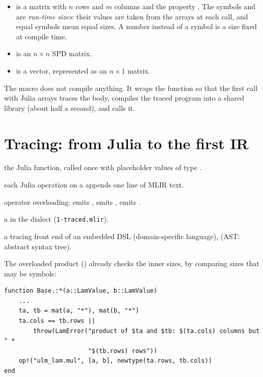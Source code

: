 \begin{itemize}
\item {} is a matrix with \(n\) rows and \(m\)
  columns and the property . The symbols  and
   are \emph{run-time sizes}: their values are taken from the
  arrays at each call, and equal symbols mean equal sizes. A number
  instead of a symbol is a size fixed at compile time.
\item {} is an \(n\times n\) SPD matrix.
\item {} is a vector, represented as an \(n\times 1\) matrix.
\end{itemize}

The macro  does not compile anything. It wraps the function so
that the first call with Julia arrays traces the body, compiles the traced
program into a shared library (about half a second), and calls it.

\section{Tracing: from Julia to the first IR}
\label{sec:gls-trace}

\begin{steps}
\item[Input] the Julia function, called once with placeholder values of type .
\item[Representation] each Julia operation on a  appends one line of MLIR text.
\item[Rule] operator overloading: \code{*} emits ,  emits ,  emits .
\item[Output] a  in the  dialect (\texttt{1-traced.mlir}).
\item[Theory] a tracing front end of an embedded DSL (domain-specific language),  (AST: abstract syntax tree).
\end{steps}

The overloaded product ()
already checks the inner sizes, by comparing sizes that may be symbols:

\begin{lstlisting}[style=jl]
function Base.:*(a::LamValue, b::LamValue)
    ...
    ta, tb = mat(a, "*"), mat(b, "*")
    ta.cols == tb.rows ||
        throw(LamError("product of $ta and $tb: $(ta.cols) columns but " *
                       "$(tb.rows) rows"))
    op!("ulm_lam.mul", [a, b], newtype(ta.rows, tb.cols))
end
\end{lstlisting}

